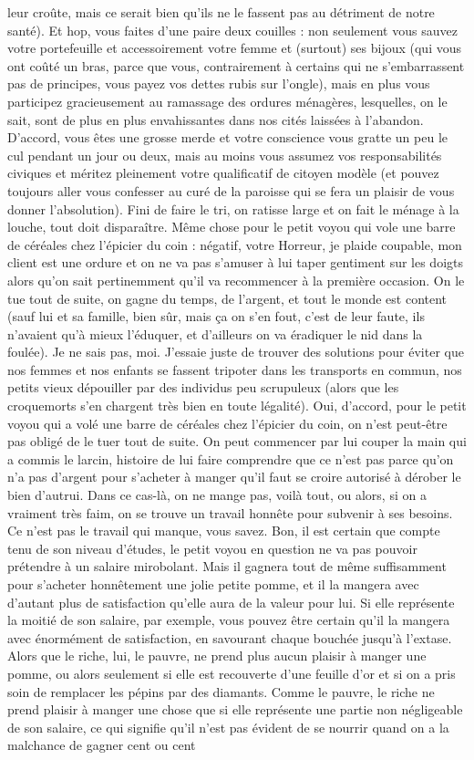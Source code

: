 leur croûte, mais ce serait bien qu’ils ne le fassent pas au détriment de notre santé). Et hop, vous faites d’une paire deux couilles : non seulement vous sauvez votre portefeuille et accessoirement votre femme et (surtout) ses bijoux (qui vous ont coûté un bras, parce que vous, contrairement à certains qui ne s’embarrassent pas de principes, vous payez vos dettes rubis sur l’ongle), mais en plus vous participez gracieusement au ramassage des ordures ménagères, lesquelles, on le sait, sont de plus en plus envahissantes dans nos cités laissées à l’abandon. D’accord, vous êtes une grosse merde et votre conscience vous gratte un peu le cul pendant un jour ou deux, mais au moins vous assumez vos responsabilités civiques et méritez pleinement votre qualificatif de citoyen modèle (et pouvez toujours aller vous confesser au curé de la paroisse qui se fera un plaisir de vous donner l’absolution). Fini de faire le tri, on ratisse large et on fait le ménage à la louche, tout doit disparaître. Même chose pour le petit voyou qui vole une barre de céréales chez l’épicier du coin : négatif, votre Horreur, je plaide coupable, mon client est une ordure et on ne va pas s’amuser à lui taper gentiment sur les doigts alors qu’on sait pertinemment qu’il va recommencer à la première occasion. On le tue tout de suite, on gagne du temps, de l’argent, et tout le monde est content (sauf lui et sa famille, bien sûr, mais ça on s’en fout, c’est de leur faute, ils n’avaient qu’à mieux l’éduquer, et d’ailleurs on va éradiquer le nid dans la foulée). Je ne sais pas, moi. J’essaie juste de trouver des solutions pour éviter que nos femmes et nos enfants se fassent tripoter dans les transports en commun, nos petits vieux dépouiller par des individus peu scrupuleux (alors que les croquemorts s’en chargent très bien en toute légalité). Oui, d’accord, pour le petit voyou qui a volé une barre de céréales chez l’épicier du coin, on n’est peut-être pas obligé de le tuer tout de suite. On peut commencer par lui couper la main qui a commis le larcin, histoire de lui faire comprendre que ce n’est pas parce qu’on n’a pas d’argent pour s’acheter à manger qu’il faut se croire autorisé à dérober le bien d’autrui. Dans ce cas-là, on ne mange pas, voilà tout, ou alors, si on a vraiment très faim, on se trouve un travail honnête pour subvenir à ses besoins. Ce n’est pas le travail qui manque, vous savez. Bon, il est certain que compte tenu de son niveau d’études, le petit voyou en question ne va pas pouvoir prétendre à un salaire mirobolant. Mais il gagnera tout de même suffisamment pour s’acheter honnêtement une jolie petite pomme, et il la mangera avec d’autant plus de satisfaction qu’elle aura de la valeur pour lui. Si elle représente la moitié de son salaire, par exemple, vous pouvez être certain qu’il la mangera avec énormément de satisfaction, en savourant chaque bouchée jusqu’à l’extase. Alors que le riche, lui, le pauvre, ne prend plus aucun plaisir à manger une pomme, ou alors seulement si elle est recouverte d’une feuille d’or et si on a pris soin de remplacer les pépins par des diamants. Comme le pauvre, le riche ne prend plaisir à manger une chose que si elle représente une partie non négligeable de son salaire, ce qui signifie qu’il n’est pas évident de se nourrir quand on a la malchance de gagner cent ou cent 